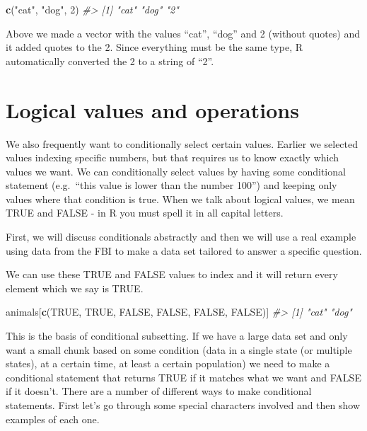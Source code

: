 \documentclass[
  12pt,
]{book}
\newenvironment{Shaded}{\begin{snugshade}}{\end{snugshade}}
\newcommand{\CommentTok}[1]{\textcolor[rgb]{0.37,0.37,0.37}{\textit{#1}}}
\newcommand{\DecValTok}[1]{\textcolor[rgb]{0.06,0.06,0.06}{#1}}
\newcommand{\KeywordTok}[1]{\textcolor[rgb]{0.27,0.27,0.27}{\textbf{#1}}}
\newcommand{\NormalTok}[1]{#1}
\newcommand{\OtherTok}[1]{\textcolor[rgb]{0.37,0.37,0.37}{#1}}
\newcommand{\StringTok}[1]{\textcolor[rgb]{0.5,0.5,0.5}{#1}}
\begin{document}
\begin{Shaded}
\begin{Highlighting}[]
\KeywordTok{c}\NormalTok{(}\StringTok{"cat"}\NormalTok{, }\StringTok{"dog"}\NormalTok{, }\DecValTok{2}\NormalTok{)}
\CommentTok{\#\textgreater{} [1] "cat" "dog" "2"}
\end{Highlighting}
\end{Shaded}

Above we made a vector with the values ``cat'', ``dog'' and 2 (without quotes) and it added quotes to the 2. Since everything must be the same type, R automatically converted the 2 to a string of ``2''.

\hypertarget{logical-values-and-operations}{%
\section{Logical values and operations}\label{logical-values-and-operations}}

We also frequently want to conditionally select certain values. Earlier we selected values indexing specific numbers, but that requires us to know exactly which values we want. We can conditionally select values by having some conditional statement (e.g.~``this value is lower than the number 100'') and keeping only values where that condition is true. When we talk about logical values, we mean TRUE and FALSE - in R you must spell it in all capital letters.

First, we will discuss conditionals abstractly and then we will use a real example using data from the FBI to make a data set tailored to answer a specific question.

We can use these TRUE and FALSE values to index and it will return every element which we say is TRUE.

\begin{Shaded}
\begin{Highlighting}[]
\NormalTok{animals[}\KeywordTok{c}\NormalTok{(}\OtherTok{TRUE}\NormalTok{, }\OtherTok{TRUE}\NormalTok{, }\OtherTok{FALSE}\NormalTok{, }\OtherTok{FALSE}\NormalTok{, }\OtherTok{FALSE}\NormalTok{, }\OtherTok{FALSE}\NormalTok{)]}
\CommentTok{\#\textgreater{} [1] "cat" "dog"}
\end{Highlighting}
\end{Shaded}

This is the basis of conditional subsetting. If we have a large data set and only want a small chunk based on some condition (data in a single state (or multiple states), at a certain time, at least a certain population) we need to make a conditional statement that returns TRUE if it matches what we want and FALSE if it doesn't. There are a number of different ways to make conditional statements. First let's go through some special characters involved and then show examples of each one.
\end{document}
